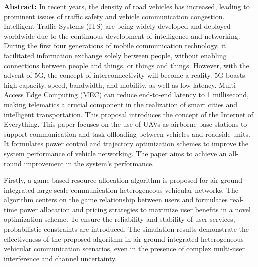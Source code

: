 \makeatletter
  \pagestyle{fancy}%
  \fancyhf{}
\makeatother
\vspace{0.39cm}  %
\noindent\textbf{Abstract: }In recent years, the density of road vehicles has increased, leading to prominent issues of traffic safety and vehicle communication congestion. Intelligent Traffic Systems (ITS) are being widely developed and deployed worldwide due to the continuous development of intelligence and networking. During the first four generations of mobile communication technology, it facilitated information exchange solely between people, without enabling connections between people and things, or things and things. However, with the advent of 5G, the concept of interconnectivity will become a reality. 5G boasts high capacity, speed, bandwidth, and mobility, as well as low latency. Multi-Access Edge Computing (MEC) can reduce end-to-end latency to 1 millisecond, making telematics a crucial component in the realization of smart cities and intelligent transportation. This proposal introduces the concept of the Internet of Everything. This paper focuses on the use of UAVs as airborne base stations to support communication and task offloading between vehicles and roadside units. It formulates power control and trajectory optimization schemes to improve the system performance of vehicle networking. The paper aims to achieve an all-round improvement in the system's performance.

Firstly, a game-based resource allocation algorithm is proposed for air-ground integrated large-scale communication heterogeneous vehicular networks. The algorithm centers on the game relationship between users and formulates real-time power allocation and pricing strategies to maximize user benefits in a novel optimization scheme. To ensure the reliability and stability of user services, probabilistic constraints are introduced. The simulation results demonstrate the effectiveness of the proposed algorithm in air-ground integrated heterogeneous vehicular communication scenarios, even in the presence of complex multi-user interference and channel uncertainty.

